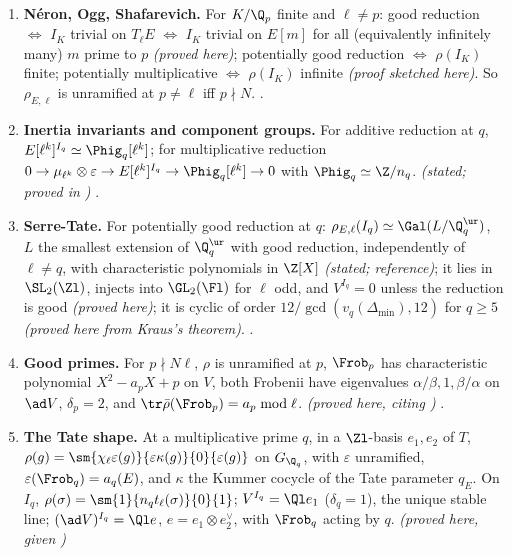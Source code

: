 \begin{enumerate}[label=\textbf{\thechapter.\arabic*}]
of density one, and so is $\bar\rho$ when it is irreducible. \emph{(proved here, citing )}
.
\item \textbf{N\'eron, Ogg, Shafarevich.} For $K/\Q_p$ finite and $\ell\ne p$: good reduction $\iff$ $I_K$ trivial on $T_\ell E$ $\iff$ $I_K$
trivial on $E[m]$ for all (equivalently infinitely many) $m$ prime to $p$ \emph{(proved here)}; potentially good reduction $\iff$
$\rho(I_K)$ finite; potentially multiplicative $\iff$ $\rho(I_K)$ infinite \emph{(proof sketched here)}. So $\rho_{E,\ell}$ is unramified at
$p\ne\ell$ iff $p\nmid N$. .
\item \textbf{Inertia invariants and component groups.} For additive reduction at $q$, $E[\ell^k]^{I_q}\simeq\Phig_q[\ell^k]$; for multiplicative
reduction $0\to\mu_{\ell^k}\otimes\varepsilon\to E[\ell^k]^{I_q}\to\Phig_q[\ell^k]\to0$ with $\Phig_q\simeq\Z/n_q$. \emph{(stated; proved in
)} .
\item \textbf{Serre-Tate.} For potentially good reduction at $q$: $\rho_{E,\ell}(I_q)\simeq\Gal(L/\Q_q^{\ur})$, $L$ the smallest extension of $\Q_q^{\ur}$
with good reduction, independently of $\ell\ne q$, with characteristic polynomials in $\Z[X]$ \emph{(stated; reference)}; it lies in
$\SL_2(\Zl)$, injects into $\GL_2(\Fl)$ for $\ell$ odd, and $V^{I_q}=0$ unless the reduction is good \emph{(proved here)}; it is cyclic of
order $12/\gcd(v_q(\Delta_{\min}),12)$ for $q\ge5$ \emph{(proved here from Kraus's theorem)}. .
\item \textbf{Good primes.} For $p\nmid N\ell$, $\rho$ is unramified at $p$, $\Frob_p$ has characteristic polynomial $X^2-a_pX+p$ on $V$, both
Frobenii have eigenvalues $\alpha/\beta,1,\beta/\alpha$ on $\ad V$, $\delta_p=2$, and $\tr\bar\rho(\Frob_p)=a_p\bmod\ell$. \emph{(proved here, citing
)} .
\item \textbf{The Tate shape.} At a multiplicative prime $q$, in a $\Zl$-basis $e_1,e_2$ of $T$,
$\rho(g)=\sm{\chi_\ell\varepsilon(g)}{\varepsilon\kappa(g)}{0}{\varepsilon(g)}$ on $G_{\Q_q}$, with $\varepsilon$ unramified, $\varepsilon(\Frob_q)=a_q(E)$, and $\kappa$
the Kummer cocycle of the Tate parameter $q_E$. On $I_q$, $\rho(\sigma)=\sm{1}{n_qt_\ell(\sigma)}{0}{1}$; $V^{I_q}=\Ql e_1$ ($\delta_q=1$), the unique
stable line; $(\ad V)^{I_q}=\Ql e$, $e=e_1\otimes e_2^\vee$, with $\Frob_q$ acting by $q$. \emph{(proved here, given )}

\end{enumerate}
